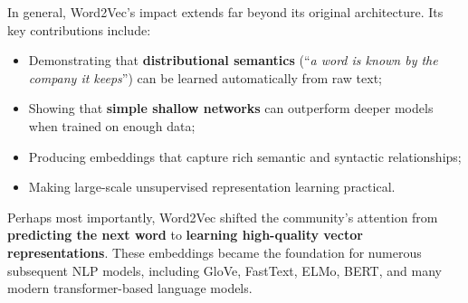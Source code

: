 \highspace
In general, Word2Vec's impact extends far beyond its original architecture. Its key contributions include:
\begin{itemize}
    \item Demonstrating that \textbf{distributional semantics} (``\emph{a word is known by the company it keeps}'') can be learned automatically from raw text;
    \item Showing that \textbf{simple shallow networks} can outperform deeper models when trained on enough data;
    \item Producing embeddings that capture rich semantic and syntactic relationships;
    \item Making large-scale unsupervised representation learning practical.
\end{itemize}
Perhaps most importantly, Word2Vec shifted the community's attention from \textbf{predicting the next word} to \textbf{learning high-quality vector representations}. These embeddings became the foundation for numerous subsequent NLP models, including GloVe, FastText, ELMo, BERT, and many modern transformer-based language models.